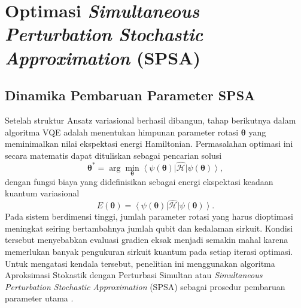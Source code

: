 \section{Optimasi \textit{Simultaneous Perturbation Stochastic Approximation} (SPSA)}
\label{sec:4_6_optimasi_spsa}

\subsection{Dinamika Pembaruan Parameter SPSA}
Setelah struktur Ansatz variasional berhasil dibangun, tahap berikutnya dalam algoritma VQE adalah menentukan himpunan parameter rotasi $\boldsymbol{\theta}$ yang meminimalkan nilai ekspektasi energi Hamiltonian. Permasalahan optimasi ini secara matematis dapat dituliskan sebagai pencarian solusi
\begin{equation}
    \boldsymbol{\theta}^{*}
    =
    \arg \min_{\boldsymbol{\theta}}
    \left\langle
    \psi(\boldsymbol{\theta})
    \right|
    \hat{\mathcal{H}}
    \left|
    \psi(\boldsymbol{\theta})
    \right\rangle ,
\end{equation}
dengan fungsi biaya yang didefinisikan sebagai energi ekspektasi keadaan kuantum variasional
\begin{equation}
    E(\boldsymbol{\theta})
    =
    \left\langle
    \psi(\boldsymbol{\theta})
    \right|
    \hat{\mathcal{H}}
    \left|
    \psi(\boldsymbol{\theta})
    \right\rangle .
\end{equation}
Pada sistem berdimensi tinggi, jumlah parameter rotasi yang harus dioptimasi meningkat seiring bertambahnya jumlah qubit dan kedalaman sirkuit. Kondisi tersebut menyebabkan evaluasi gradien eksak menjadi semakin mahal karena memerlukan banyak pengukuran sirkuit kuantum pada setiap iterasi optimasi. Untuk mengatasi kendala tersebut, penelitian ini menggunakan algoritma Aproksimasi Stokastik dengan Perturbasi Simultan atau \textit{Simultaneous Perturbation Stochastic Approximation} (SPSA) sebagai prosedur pembaruan parameter utama \cite{spall_implementation_1998}.

